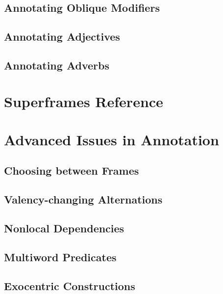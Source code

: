 \documentclass[a4paper]{article}
\begin{document}
\subsection{Annotating Oblique Modifiers}

\subsection{Annotating Adjectives}

\subsection{Annotating Adverbs}

\section{Superframes Reference}

\section{Advanced Issues in Annotation}

\subsection{Choosing between Frames}

\subsection{Valency-changing Alternations}

\subsection{Nonlocal Dependencies}

\subsection{Multiword Predicates}

\subsection{Exocentric Constructions}

%
%
\end{document}

